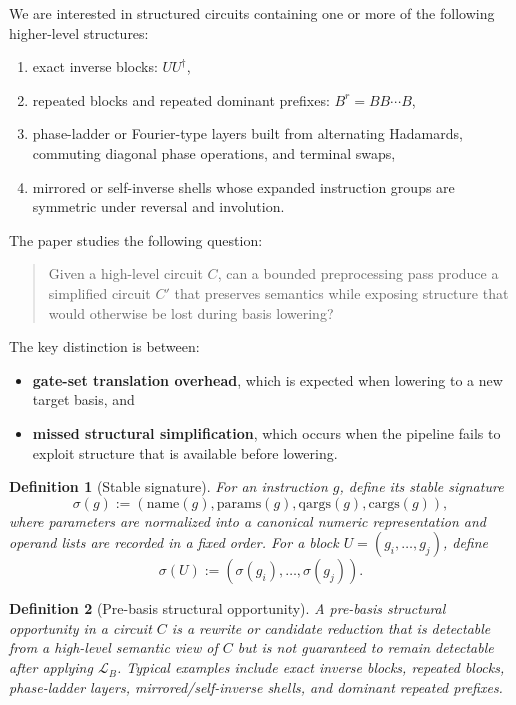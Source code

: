 \documentclass[11pt]{article}
\newtheorem{definition}{Definition}
\begin{document}
We are interested in structured circuits containing one or more of the following higher-level structures:
\begin{enumerate}[leftmargin=1.5em]
    \item exact inverse blocks: $U U^\dagger$,
    \item repeated blocks and repeated dominant prefixes: $B^r = B B \cdots B$,
    \item phase-ladder or Fourier-type layers built from alternating Hadamards, commuting diagonal phase operations, and terminal swaps,
    \item mirrored or self-inverse shells whose expanded instruction groups are symmetric under reversal and involution.
\end{enumerate}

The paper studies the following question:

\begin{quote}
Given a high-level circuit $C$, can a bounded preprocessing pass produce a simplified circuit $C'$ that preserves semantics while exposing structure that would otherwise be lost during basis lowering?
\end{quote}

The key distinction is between:
\begin{itemize}[leftmargin=1.5em]
    \item \textbf{gate-set translation overhead}, which is expected when lowering to a new target basis, and
    \item \textbf{missed structural simplification}, which occurs when the pipeline fails to exploit structure that is available before lowering.
\end{itemize}

\begin{definition}[Stable signature]
For an instruction $g$, define its \emph{stable signature}
\[
\sigma(g) := (\mathrm{name}(g), \mathrm{params}(g), \mathrm{qargs}(g), \mathrm{cargs}(g)),
\]
where parameters are normalized into a canonical numeric representation and operand lists are recorded in a fixed order. For a block $U = (g_i,\dots,g_j)$, define
\[
\sigma(U) := (\sigma(g_i),\dots,\sigma(g_j)).
\]
\end{definition}

\begin{definition}[Pre-basis structural opportunity]
A \emph{pre-basis structural opportunity} in a circuit $C$ is a rewrite or candidate reduction that is detectable from a high-level semantic view of $C$ but is not guaranteed to remain detectable after applying $\mathcal{L}_B$. Typical examples include exact inverse blocks, repeated blocks, phase-ladder layers, mirrored/self-inverse shells, and dominant repeated prefixes.
\end{definition}
\end{document}
